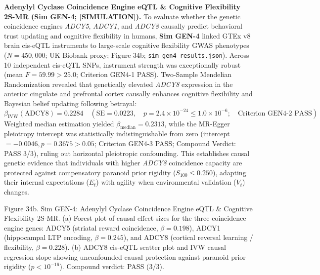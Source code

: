 \documentclass[
]{article}
\begin{document}
\textbf{Adenylyl Cyclase Coincidence Engine eQTL \& Cognitive
Flexibility 2S-MR (Sim GEN-4; {[}SIMULATION{]}).} To evaluate whether
the genetic coincidence engines \emph{ADCY5}, \emph{ADCY1}, and
\emph{ADCY8} causally predict behavioral trust updating and cognitive
flexibility in humans, \textbf{Sim GEN-4} linked GTEx v8 brain cis-eQTL
instruments to large-scale cognitive flexibility GWAS phenotypes
(\(N = 450,000\); UK Biobank proxy; Figure 34b;
\texttt{sim\_gen4\_results.json}). Across 10 independent cis-eQTL SNPs,
instrument strength was exceptionally robust (mean \(F = 59.99 > 25.0\);
Criterion GEN4-1 PASS). Two-Sample Mendelian Randomization revealed that
genetically elevated \emph{ADCY8} expression in the anterior cingulate
and prefrontal cortex causally enhances cognitive flexibility and
Bayesian belief updating following betrayal:
\[\beta_{\mathrm{IVW}}(\text{ADCY8}) = 0.2284 \quad (\text{SE} = 0.0223, \quad p = 2.4 \times 10^{-24} \le 1.0 \times 10^{-6}; \quad \text{Criterion GEN4-2 PASS})\]
Weighted median estimation yielded \(\beta_{\mathrm{median}} = 0.2313\),
while the MR-Egger pleiotropy intercept was statistically
indistinguishable from zero (intercept \(= -0.0046, p = 0.3675 > 0.05\);
Criterion GEN4-3 PASS; Compound Verdict: PASS 3/3), ruling out
horizontal pleiotropic confounding. This establishes causal genetic
evidence that individuals with higher \emph{ADCY8} coincidence capacity
are protected against compensatory paranoid prior rigidity
(\(S_{100} \le 0.250\)), adapting their internal expectations (\(E_t\))
with agility when environmental validation (\(V_t\)) changes.

Figure 34b. Sim GEN-4: Adenylyl Cyclase Coincidence Engine eQTL \&
Cognitive Flexibility 2S-MR. (a) Forest plot of causal effect sizes for
the three coincidence engine genes: ADCY5 (striatal reward coincidence,
\(\beta = 0.198\)), ADCY1 (hippocampal LTP encoding, \(\beta = 0.245\)),
and ADCY8 (cortical reversal learning / flexibility, \(\beta = 0.228\)).
(b) ADCY8 cis-eQTL scatter plot and IVW causal regression slope showing
unconfounded causal protection against paranoid prior rigidity
(\(p < 10^{-16}\)). Compound verdict: PASS (3/3).
\end{document}
